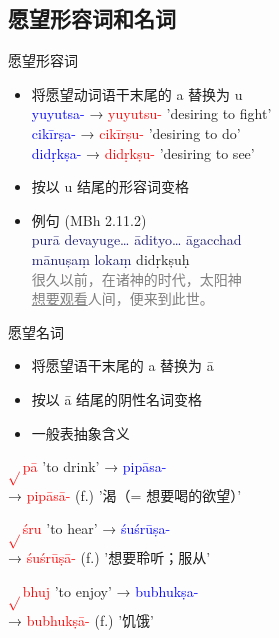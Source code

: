 \documentclass[17pt]{beamer}
\newenvironment{indentlist}
  {\begin{list}{}{\setlength{\leftmargin}{2em}\setlength{\itemsep}{0.5em}}}
  {\end{list}}
\newcommand{\verbroot}[1]{\textcolor{red}{$\sqrt{}$#1}}
\newcommand{\nounstem}[1]{\textcolor{red}{#1\nobreakdash-}}
\newcommand{\verbstem}[1]{\textcolor{blue}{#1\nobreakdash-}}
\newcommand{\fullpada}[1]{\textcolor{OliveGreen}{#1}}
\newcommand{\fullsentence}[1]{\textcolor{MidnightBlue}{#1}}
\newcommand{\notsoimportant}[1]{\textcolor{gray}{#1}}
\begin{document}
\subsection{愿望形容词和名词}
\begin{frame}{愿望形容词}
  \small
  \begin{itemize}
    \item 将愿望动词语干末尾的 a 替换为 u\\
    \verbstem{yuyutsa} →  \nounstem{yuyutsu} 'desiring to fight' \\
    \verbstem{cikīrṣa} →  \nounstem{cikīrṣu} 'desiring to do' \\
    \verbstem{didṛkṣa} →  \nounstem{didṛkṣu} 'desiring to see' 
    \item 按以 u 结尾的形容词变格\\
    \item 例句 (MBh 2.11.2)\\
    \fullsentence{purā devayuge\ldots{} ādityo\ldots{} āgacchad}\\
    \fullsentence{mānuṣaṃ lokaṃ} \fullpada{didṛkṣuḥ}\\
    \notsoimportant{很久以前，在诸神的时代，太阳神}\\
    \notsoimportant{\underline{想要观看}人间，便来到此世。}
  \end{itemize}
\end{frame}

\begin{frame}{愿望名词}
  \small
  \begin{itemize}
    \item 将愿望语干末尾的 a 替换为 ā
    \item 按以 ā 结尾的阴性名词变格
    \item 一般表抽象含义
  \end{itemize}
  \begin{indentlist}
    \item \verbroot{pā} 'to drink' → \verbstem{pipāsa} \\
    → \nounstem{pipāsā} (f.) '渴（= 想要喝的欲望）'\\
    \item \verbroot{śru} 'to hear' → \verbstem{śuśrūṣa} \\
    → \nounstem{śuśrūṣā} (f.) '想要聆听；服从'\\
    \item \verbroot{bhuj} 'to enjoy' → \verbstem{bubhukṣa} \\
    → \nounstem{bubhukṣā} (f.) '饥饿'\\
  \end{indentlist}
\end{frame}
\end{document}
